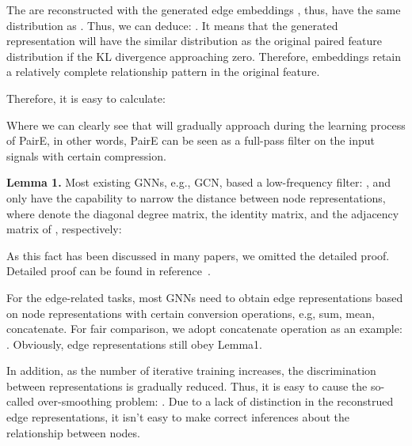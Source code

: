 \documentclass[10pt,journal,compsoc]{IEEEtran}
\begin{document}
  
The  are reconstructed with the generated edge embeddings , thus,  have the same distribution as . Thus, we can deduce: . It means that the generated representation  will have the similar distribution as the original paired feature distribution if the KL divergence approaching zero. Therefore, embeddings retain a relatively complete relationship pattern in the original feature. 


Therefore, it is easy to calculate: 
   
Where we can clearly see that  will gradually approach  during the learning process of PairE, in other words, PairE can be seen as a full-pass filter on the input signals with certain compression.

\noindent\textbf{Lemma 1.} Most existing GNNs, e.g., GCN, based a low-frequency filter: , and only have the capability to narrow the distance between node representations, where  denote the diagonal degree matrix, the identity matrix, and the adjacency matrix of , respectively:  


As this fact has been discussed in many papers, we omitted the detailed proof. Detailed proof can be found in reference~\cite{bo21}.


For the edge-related tasks, most GNNs need to obtain edge representations based on node representations with certain conversion operations, e.g, sum, mean, concatenate. For fair comparison, we adopt concatenate operation as an example: . Obviously, edge representations still obey Lemma1.






In addition, as the number of iterative training increases, the discrimination between representations is gradually reduced. Thus, it is easy to cause the so-called over-smoothing problem: . Due to a lack of distinction in the reconstrued edge representations, it isn't easy to make correct inferences about the relationship between nodes.













   
\end{document}

